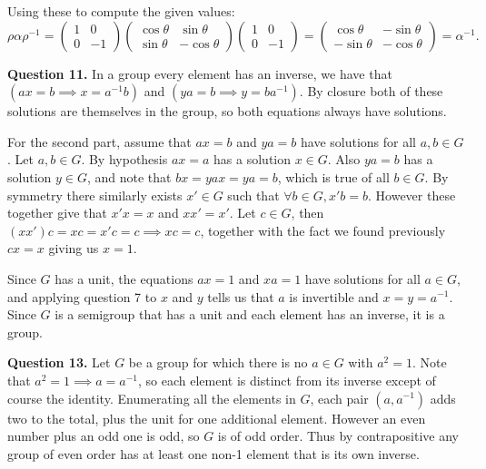 \documentclass[letterpaper, reqno,11pt]{article}
\begin{document}
Using these to compute the given values:
\[
\rho \alpha\rho^{-1}=\begin{pmatrix} 1&0\\0&-1 \end{pmatrix}\begin{pmatrix} \cos\theta&\sin\theta\\ \sin\theta&-\cos\theta \end{pmatrix}\begin{pmatrix} 1&0\\0&-1 \end{pmatrix}=\begin{pmatrix} \cos\theta&-\sin\theta\\ -\sin\theta&-\cos\theta \end{pmatrix}=\alpha ^{-1}
.\]

{\medskip\noindent\bf Question 11.} In a group every element has an inverse, we have that $\left( ax=b\implies x=a^{-1}b \right) $ and $\left( ya=b\implies y=ba^{-1} \right) $. By closure both of these solutions are themselves in the group, so both equations always have solutions.

For the second part, assume that $ax=b$ and $ya=b$ have solutions for all $a,b\in G$. Let $a,b\in G$. By hypothesis $ax=a$ has a solution $x\in G$. Also $ya=b$ has a solution $y\in G$, and note that $bx=yax=ya=b$, which is true of all $b\in G$. By symmetry there similarly exists $x'\in G$ such that $\forall b\in G, x'b=b$. However these together give that $x'x=x$ and $xx'=x'$. Let $c\in G$, then $(xx') c=xc=x'c=c\implies xc=c$, together with the fact we found previously $cx=x$ giving us $x=1$. 

Since $G$ has a unit, the equations $ax=1$ and $xa=1$ have solutions for all $a\in G$, and applying question 7 to $x$ and $y$ tells us that $a$ is invertible and $x=y=a^{-1}$. Since $G$ is a semigroup that has a unit and each element has an inverse, it is a group.

{\medskip\noindent\bf Question 13.} Let $G$ be a group for which there is no $a\in G$ with $a^2=1$. Note that $a^2=1\implies a=a^{-1}$, so each element is distinct from its inverse except of course the identity. Enumerating all the elements in $G$, each pair $(a,a^{-1})$ adds two to the total, plus the unit for one additional element. However an even number plus an odd one is odd, so $G$ is of odd order. Thus by contrapositive any group of even order has at least one non-1 element that is its own inverse.
\end{document}
